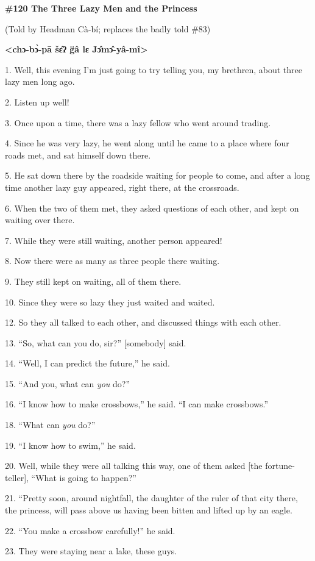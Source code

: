 
\textbf{\#120 The Three Lazy Men and the Princess}

(Told by Headman Cà-bí; replaces the badly told \#83)

\textbf{<chɔ-bɔ̀-pā šɛ̂ʔ g̈â lɛ Jɔ̂mɔ̂-yâ-mî>}

1. Well, this evening I'm just going to try telling you, my brethren, about three
lazy men long ago.

2. Listen up well!

3. Once upon a time, there was a lazy fellow who went around trading.

4. Since he was very lazy, he went along until he came to a place where four roads
met, and sat himself down there.

5. He sat down there by the roadside waiting for people to come, and after a long
time another lazy guy appeared, right there, at the crossroads.

6. When the two of them met, they asked questions of each other, and kept on waiting
over there.

7. While they were still waiting, another person appeared!

8. Now there were as many as three people there waiting.

9. They still kept on waiting, all of them there.

10. Since they were so lazy they just waited and waited.

12. So they all talked to each other, and discussed things with each other.

13. ``So, what can you do, sir?'' [somebody] said.

14. ``Well, I can predict the future,'' he said.

15. ``And you, what can \textit{you} do?''

16. ``I know how to make crossbows,'' he said. ``I can make crossbows.''

18. ``What can \textit{you} do?''

19. ``I know how to swim,'' he said.

20. Well, while they were all talking this way, one of them asked [the fortune-teller],
``What is going to happen?''

21. ``Pretty soon, around nightfall, the daughter of the ruler of that city there,
the princess, will pass above us having been bitten and lifted up by an eagle.

22. ``You make a crossbow carefully!'' he said.

23. They were staying near a lake, these guys.

